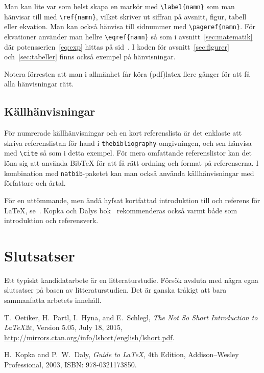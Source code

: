 \documentclass[swedish, 12pt, a4paper, elec, utf8, a-2b, online]{aaltothesis}
\begin{document}
Man kan lite var som helst skapa en markör med \verb|\label{namn}| som
man hänvisar till med \verb|\ref{namn}|, vilket skriver ut siffran på
avsnitt, figur, tabell eller ekvation. Man kan också hänvisa till
sidnummer med \verb|\pageref{namn}|. För ekvationer använder man
hellre \verb|\eqref{namn}| så som i avsnitt~\ref{sec:matematik} där
potensserien~\eqref{eq:exp} hittas på sid~\pageref{eq:exp}. I koden
för avsnitt~\ref{sec:figurer} och~\ref{sec:tabeller} finns också
exempel på hänvisningar.

Notera förresten att man i allmänhet får köra (pdf)latex flere gånger för
att få alla hänvisningar rätt.

\subsection{Källhänvisningar}

För numrerade källhänvisningar och en kort referenslista är det enklaste
att skriva referenslistan för hand i \verb|thebibliography|-omgivningen,
och sen hänvisa med \verb|\cite| så som i detta exempel. För mera
omfattande referenslistor kan det löna sig att använda BibTeX för att få
rätt ordning och format på referenserna. I kombination med
\verb|natbib|-paketet kan man också använda källhänvisningar med författare
och årtal.

För en uttömmande, men ändå hyfsat kortfattad introduktion till och
referens för \LaTeX, se~\cite{lshort}. Kopka och Dalys
bok~\cite{kopka_daly} rekommenderas också varmt både som introduktion
och referensverk.

\clearpage
\section{Slutsatser}

Ett typiskt kandidatarbete är en litteraturstudie. Försök avsluta med några
egna slutsatser på basen av litteraturstudien. Det är ganska tråkigt att
bara sammanfatta arbetets innehåll.



\clearpage
\thesisbibliography
\begin{thebibliography}{99}

 T.\ Oetiker, H.\ Partl, I.\ Hyna, and E.\ Schlegl,
  \emph{The Not So Short Introduction to \LaTeX 2$\varepsilon$},
  Version 5.05, July 18, 2015,
  \url{http://mirrors.ctan.org/info/lshort/english/lshort.pdf}.

 H.\ Kopka and P.\ W.\ Daly, \emph{Guide to
    \LaTeX}, 4th Edition, Addison--Wesley Professional, 2003, ISBN:
  978-0321173850.

\end{thebibliography}

\end{document}

